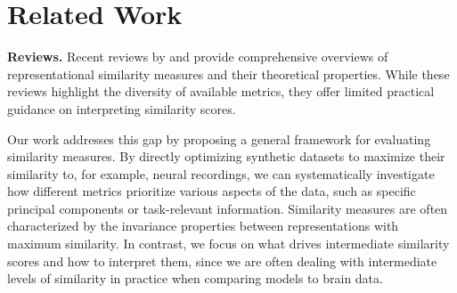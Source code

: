 \documentclass{article} %
\def\myspaceaftersections{\vspace{-0.2cm}}%
\def\myspaceafterfigures{\vspace{-0.21cm}}%
\begin{document}
\begin{figure}[h]
{ %
 }
    \label{fig:rnn}%
    \myspaceafterfigures
\end{figure}

\section{Related Work}  \myspaceaftersections
\textbf{Reviews.} Recent reviews by \citet{sucholutsky2023getting} and \citet{klabunde2023similarity}  provide comprehensive overviews of representational similarity measures and their theoretical properties. While these reviews highlight the diversity of available metrics, they offer limited practical guidance on interpreting similarity scores.%


Our work addresses this gap by proposing a general framework for evaluating similarity measures. By directly optimizing synthetic datasets to maximize their similarity to, for example, neural recordings, we can systematically investigate how different metrics prioritize various aspects of the data, such as specific principal components or task-relevant information. %
Similarity measures are often characterized by the invariance properties between representations with maximum similarity. In contrast, we focus on what drives intermediate similarity scores and how to interpret them, since we are often dealing with intermediate levels of similarity in practice when comparing models to brain data.
\end{document}

